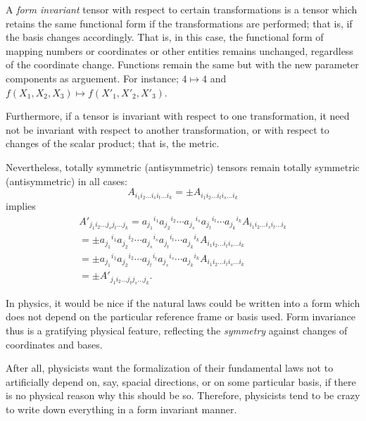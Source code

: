 A {\em form invariant} tensor with respect to  certain transformations
is a tensor which retains
the same functional form if the transformations are performed; that is,
if the basis changes accordingly.
That is, in this case,
the functional form of mapping numbers or coordinates or other entities remains unchanged, regardless of the coordinate change.
Functions remain the same but with the new parameter components as
arguement. For instance; $4\mapsto 4$ and $f(X_1,X_2,X_3)\mapsto
f(X'_1,X'_2,X'_3)$.

Furthermore, if a tensor is invariant with respect to one transformation, it need not
be invariant with respect to another transformation, or with respect to
changes of the scalar product; that is, the metric.

Nevertheless, totally symmetric (antisymmetric) tensors remain totally
symmetric (antisymmetric) in all cases:
\begin{equation}
A_{i_1i_2 \ldots i_si_t\ldots i_k}
=
\pm A_{i_1i_2 \ldots i_ti_s\ldots i_k}
\end{equation}
implies
\begin{equation}
\begin{split}
A'_{j_1i_2 \ldots j_s j_t\ldots j_k}
=
{a_{j_1}}^{i_1}{a_{j_2}}^{i_2}
\cdots
{a_{j_s}}^{i_s}{a_{j_t}}^{i_t}
\cdots
{a_{j_k}}^{i_k} A_{i_1 i_2\ldots i_s i_t\ldots  i_k}
 \\
=
\pm {a_{j_1}}^{i_1}{a_{j_2}}^{i_2}\cdots
{a_{j_s}}^{i_s}{a_{j_t}}^{i_t}\cdots
{a_{j_k}}^{i_k} A_{i_1 i_2\ldots i_t i_s\ldots  i_k}
  \\
=
\pm {a_{j_1}}^{i_1}{a_{j_2}}^{i_2}
\cdots
{a_{j_t}}^{i_t}{a_{j_s}}^{i_s}
\cdots
{a_{j_k}}^{i_k} A_{i_1 i_2\ldots i_t i_s\ldots  i_k}
  \\
=
\pm A'_{j_1i_2 \ldots j_t j_s\ldots j_k}    .
\end{split}
\end{equation}


In physics, it would be nice if the natural laws could be written into a
form which does not depend on the particular reference frame or  basis
used.
Form invariance thus is a gratifying physical feature, reflecting the
{\em symmetry} against changes of coordinates and bases.

After all, physicists want the formalization of their fundamental laws not to artificially depend on,
say, spacial directions, or on some particular basis, if there is no physical reason why this should be so.
Therefore, physicists tend to be crazy to write down everything in a
form invariant manner.

